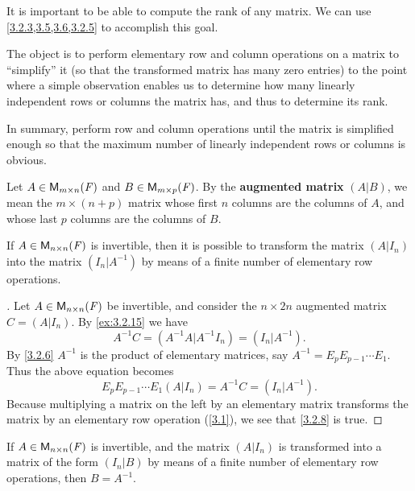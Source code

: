 \begin{note}
  It is important to be able to compute the rank of any matrix.
  We can use \cref{3.2.3,3.5,3.6,3.2.5} to accomplish this goal.

  The object is to perform elementary row and column operations on a matrix to ``simplify'' it (so that the transformed matrix has many zero entries) to the point where a simple observation enables us to determine how many linearly independent rows or columns the matrix has, and thus to determine its rank.

  In summary, perform row and column operations until the matrix is simplified enough so that the maximum number of linearly independent rows or columns is obvious.
\end{note}

\begin{defn}\label{3.2.7}
  Let \(A \in \ms\) and \(B \in \ms[m][p][\F]\).
  By the \textbf{augmented matrix} \((A | B)\), we mean the \(m \times (n + p)\) matrix whose first \(n\) columns are the columns of \(A\), and whose last \(p\) columns are the columns of \(B\).
\end{defn}

\begin{cor}\label{3.2.8}
  If \(A \in \ms[n][n][\F]\) is invertible, then it is possible to transform the matrix \((A | I_n)\) into the matrix \((I_n | A^{-1})\) by means of a finite number of elementary row operations.
\end{cor}

\begin{proof}[]
  Let \(A \in \ms[n][n][\F]\) be invertible, and consider the \(n \times 2n\) augmented matrix \(C = (A | I_n)\).
  By \cref{ex:3.2.15} we have
  \[
    A^{-1} C = (A^{-1} A | A^{-1} I_n) = (I_n | A^{-1}).
  \]
  By \cref{3.2.6} \(A^{-1}\) is the product of elementary matrices, say \(A^{-1} = E_p E_{p - 1} \cdots E_1\).
  Thus the above equation becomes
  \[
    E_p E_{p - 1} \cdots E_1 (A | I_n) = A^{-1} C = (I_n | A^{-1}).
  \]
  Because multiplying a matrix on the left by an elementary matrix transforms the matrix by an elementary row operation (\cref{3.1}), we see that \cref{3.2.8} is true.
\end{proof}

\begin{cor}\label{3.2.9}
  If \(A \in \ms[n][n][\F]\) is invertible, and the matrix \((A | I_n)\) is transformed into a matrix of the form \((I_n | B)\) by means of a finite number of elementary row operations, then \(B = A^{-1}\).
\end{cor}

